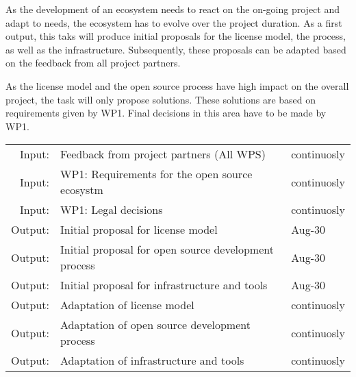 \documentclass[11pt, a4paper]{article}
\newenvironment{inoutput}
{\vspace{2mm}
\noindent
\begin{tabular}{|r|p{.7\linewidth}|l|}
\hline}
{
\hline
\end{tabular}}
\begin{document}
As the development of an ecosystem needs to react on the on-going project and adapt to needs, the ecosystem has to evolve over the project duration. As a first output, this taks will produce initial proposals for the license model, the process, as well as the infrastructure. Subsequently, these proposals can be adapted based on the feedback from all project partners.

As the license model and the open source process have high impact on the overall project, the task will only propose solutions. These solutions are based on requirements given by WP1. Final decisions in this area have to be made by WP1. 

\begin{inoutput}
Input: & Feedback from project partners (All WPS) & continuosly \\
Input: & WP1: Requirements for the open source ecosystm & continuosly \\
Input: & WP1: Legal decisions & continuosly \\
Output: & Initial proposal for license model & Aug-30 \\
Output: & Initial proposal for open source development process & Aug-30 \\
Output: & Initial proposal for infrastructure and tools & Aug-30 \\
Output: & Adaptation of license model & continuosly \\
Output: & Adaptation of open source development process & continuosly \\
Output: & Adaptation of infrastructure and tools & continuosly \\
\end{inoutput}
\end{document}
